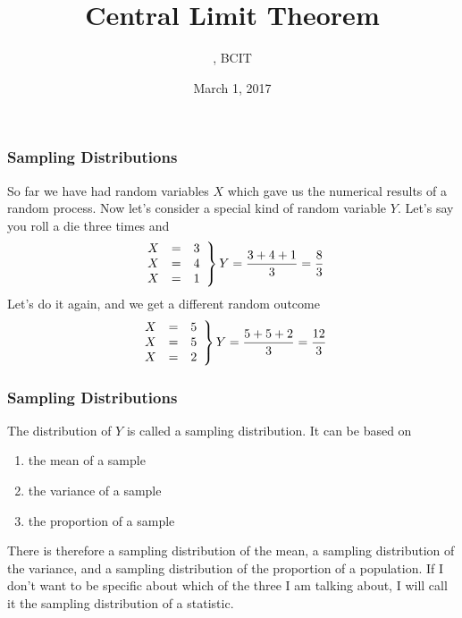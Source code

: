 \documentclass[xcolor=dvipsnames]{beamer}
\title{Central Limit Theorem}
\subtitle{{\CourseNumber}, BCIT}
\author{\CourseName}
\date{March 1, 2017}
\begin{document}
\begin{frame}
  \titlepage
\end{frame}

\begin{frame}
  \frametitle{Sampling Distributions}
So far we have had random variables $X$ which gave us the numerical
results of a random process. Now let's consider a special kind of
random variable $Y$. Let's say you roll a die three times and
\begin{equation}
  \label{eq:quaegieg}
  \left.\begin{array}{rcl}
    X&=&3 \\
    X&=&4 \\
    X&=&1
  \end{array}\right\}Y=\frac{3+4+1}{3}=\frac{8}{3}\notag
\end{equation}
Let's do it again, and we get a different random outcome
\begin{equation}
  \label{eq:iitiloox}
  \left.\begin{array}{rcl}
    X&=&5 \\
    X&=&5 \\
    X&=&2
  \end{array}\right\}Y=\frac{5+5+2}{3}=\frac{12}{3}\notag
\end{equation}
\end{frame}

\begin{frame}
  \frametitle{Sampling Distributions}
The distribution of $Y$ is called a \alert{sampling distribution}. It
can be based on 
\begin{enumerate}
\item the \alert{mean} of a sample
\item the \alert{variance} of a sample
\item the \alert{proportion} of a sample
\end{enumerate}
There is therefore a sampling distribution of the mean, a sampling
distribution of the variance, and a sampling distribution of the
proportion of a population. If I don't want to be specific about which
of the three I am talking about, I will call it the sampling
distribution of a \alert{statistic}.
\end{frame}
\end{document}
